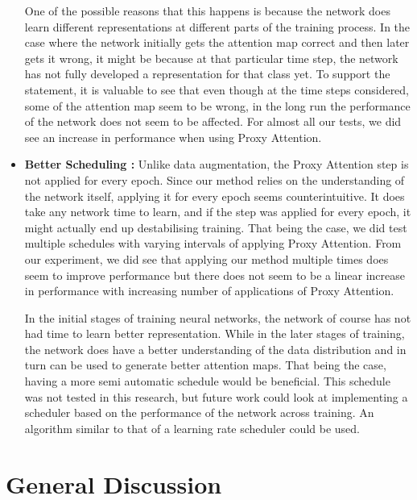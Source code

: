 \begin{itemize}
One of the possible reasons that this happens is because the network does learn different representations at different parts of the training process. In the case where the network initially gets the attention map correct and then later gets it wrong, it might be because at that particular time step, the network has not fully developed a representation for that class yet. To support the statement, it is valuable to see that even though at the time steps considered, some of the attention map seem to be wrong, in the long run the performance of the network does not seem to be affected. For almost all our tests, we did see an increase in performance when using Proxy Attention.
\item \textbf{Better Scheduling :} Unlike data augmentation, the Proxy Attention step is not applied for every epoch. Since our method relies on the understanding of the network itself, applying it for every epoch seems counterintuitive. It does take any network time to learn, and if the step was applied for every epoch, it might actually end up destabilising training. That being the case, we did test multiple schedules with varying intervals of applying Proxy Attention. From our experiment, we did see that applying our method multiple times does seem to improve performance but there does not seem to be a linear increase in performance with increasing number of applications of Proxy Attention. 

In the initial stages of training neural networks, the network of course has not had time to learn better representation. While in the later stages of training, the network does have a better understanding of the data distribution and in turn can be used to generate better attention maps. That being the case, having a more semi automatic schedule would be beneficial. This schedule was not tested in this research, but future work could look at implementing a scheduler based on the performance of the network across training. An algorithm similar to that of a learning rate scheduler could be used.
\end{itemize}

\section{General Discussion} 
